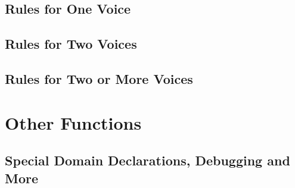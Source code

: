 \subsection*{Rules for One Voice}
\label{sec:org05dc49f}


\subsection*{Rules for Two Voices}
\label{sec:orga55fed6}


\subsection*{Rules for Two or More Voices}
\label{sec:org49f0c90}


\section*{Other Functions}
\label{sec:org12c5730}

\subsection*{Special Domain Declarations, Debugging and More}
\label{sec:org28775d4}

